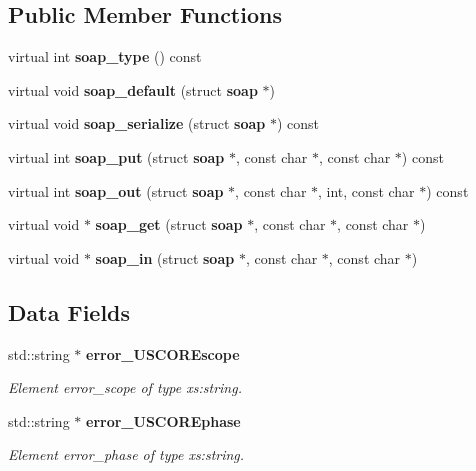 \subsection*{Public Member Functions}
\begin{DoxyCompactItemize}
\item 
virtual int {\bfseries soap\_\-type} () const \label{classtransfer____FileTransferStatus2_ade3559547f4e61deb23e63e1b3266cc9}

\item 
virtual void {\bfseries soap\_\-default} (struct {\bf soap} $\ast$)\label{classtransfer____FileTransferStatus2_a90c52f3be885acd7affb97629787774e}

\item 
virtual void {\bfseries soap\_\-serialize} (struct {\bf soap} $\ast$) const \label{classtransfer____FileTransferStatus2_a9bf9d6304a7d975516e2db07f4bfd883}

\item 
virtual int {\bfseries soap\_\-put} (struct {\bf soap} $\ast$, const char $\ast$, const char $\ast$) const \label{classtransfer____FileTransferStatus2_a1812dcece75c2acba545ea6b93134108}

\item 
virtual int {\bfseries soap\_\-out} (struct {\bf soap} $\ast$, const char $\ast$, int, const char $\ast$) const \label{classtransfer____FileTransferStatus2_a43e1179a6657b04e56b0b27c9e389e3e}

\item 
virtual void $\ast$ {\bfseries soap\_\-get} (struct {\bf soap} $\ast$, const char $\ast$, const char $\ast$)\label{classtransfer____FileTransferStatus2_ab298f85f3d52ff1b06785606b1381b7c}

\item 
virtual void $\ast$ {\bfseries soap\_\-in} (struct {\bf soap} $\ast$, const char $\ast$, const char $\ast$)\label{classtransfer____FileTransferStatus2_ae618347ccaf53da1a223cb52b42138f7}

\end{DoxyCompactItemize}
\subsection*{Data Fields}
\begin{DoxyCompactItemize}
\item 
std::string $\ast$ {\bf error\_\-USCOREscope}
\begin{DoxyCompactList}\small\item\em Element error\_\-scope of type xs:string. \item\end{DoxyCompactList}\item 
std::string $\ast$ {\bf error\_\-USCOREphase}
\begin{DoxyCompactList}\small\item\em Element error\_\-phase of type xs:string. \item\end{DoxyCompactList}\end{DoxyCompactItemize}



